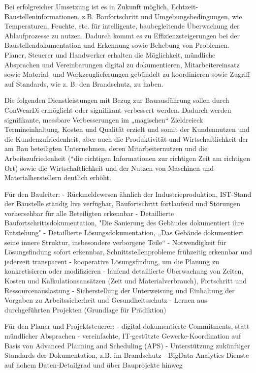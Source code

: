 Bei erfolgreicher Umsetzung ist es in Zukunft möglich, Echtzeit-Baustelleninformationen, z.B. Baufortschritt und Umgebungsbedingungen, wie Temperaturen, Feuchte, etc. für intelligente, baubegleitende Überwachung der Ablaufprozesse zu nutzen. Dadurch kommt es zu Effizienzsteigerungen bei der Baustellendokumentation und Erkennung sowie Behebung von Problemen. Planer, Steuerer und Handwerker erhalten die Möglichkeit, mündliche Absprachen und Vereinbarungen digital zu dokumentieren, Mitarbeitereinsatz sowie Material- und Werkzeuglieferungen gebündelt zu koordinieren sowie Zugriff auf Standards, wie z. B. den Brandschutz, zu haben.

Die folgenden Dienstleistungen mit Bezug zur Bauausführung sollen durch ConWearDi ermöglicht oder signifikant verbessert werden. Dadurch werden signifikante, messbare Verbesserungen im „magischen“ Zieldreieck Termineinhaltung, Kosten und Qualität erzielt und somit der  Kundennutzen und die Kundenzufriedenheit, aber auch die Produktivität und Wirtschaftlichkeit der am Bau beteiligten Unternehmen, deren Mitarbeiternutzen und die Arbeitszufriedenheit (“die richtigen Informationen zur richtigen Zeit am richtigen Ort) sowie die Wirtschaftlichkeit und der Nutzen von Maschinen und Materialherstellern deutlich erhöht.

Für den Bauleiter:
- Rückmeldewesen ähnlich der Industrieproduktion, IST-Stand der Baustelle ständig live verfügbar, Baufortschritt fortlaufend und Störungen vorhersehbar für alle Beteiligten erkennbar
- Detaillierte Baufortschrittsdokumentation, "Die Sanierung des Gebäudes dokumentiert ihre Entstehung"
- Detaillierte Lösungsdokumentation, „Das Gebäude dokumentiert seine innere Struktur, insbesondere verborgene Teile“
- Notwendigkeit für Lösungsfindung sofort erkennbar, Schnittstellenprobleme frühzeitig erkennbar und jederzeit transparent
- kooperative Lösungsfindung, um die  Planung zu  konkretisieren  oder  modifizieren 
- laufend detaillierte Überwachung von Zeiten, Kosten und Kalkulationsansätzen (Zeit und Materialverbrauch), Fortschritt und Ressourcenauslastung
- Sicherstellung der Unterweisung und Einhaltung der Vorgaben zu Arbeitssicherheit und Gesundheitsschutz
- Lernen aus durchgeführten Projekten (Grundlage für Prädiktion) 


Für den Planer und Projektsteuerer:
- digital dokumentierte Commitments, statt mündlicher Absprachen
- vereinfachte, IT-gestützte Gewerke-Koordination auf Basis von Advanced Planning and Scheduling (APS)
- Unterstützung zukünftiger Standards der Dokumentation, z.B. im Brandschutz
- BigData Analytics Dienste auf hohem Daten-Detailgrad und über Bauprojekte hinweg



